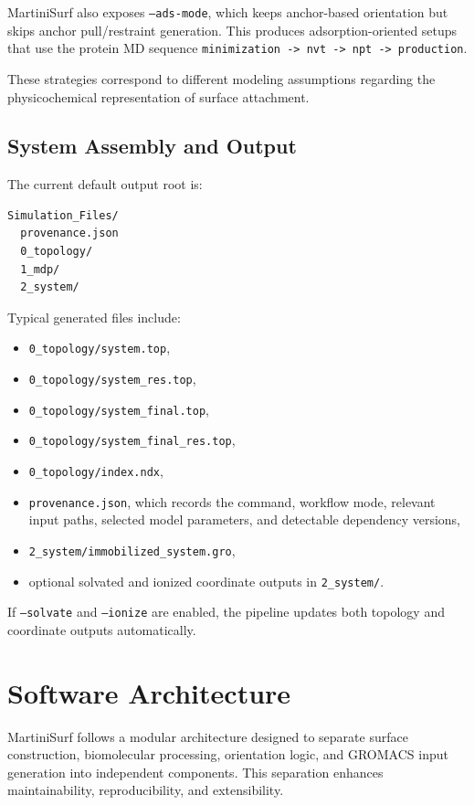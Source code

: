 \documentclass[11pt]{article}
\begin{document}
MartiniSurf also exposes \texttt{--ads-mode}, which keeps anchor-based
orientation but skips anchor pull/restraint generation. This produces
adsorption-oriented setups that use the protein MD sequence
\texttt{minimization -> nvt -> npt -> production}.

These strategies correspond to different modeling assumptions
regarding the physicochemical representation of surface attachment.
\subsection{System Assembly and Output}

The current default output root is:

\begin{lstlisting}
Simulation_Files/
  provenance.json
  0_topology/
  1_mdp/
  2_system/
\end{lstlisting}

Typical generated files include:
\begin{itemize}
  \item \texttt{0\_topology/system.top},
  \item \texttt{0\_topology/system\_res.top},
  \item \texttt{0\_topology/system\_final.top},
  \item \texttt{0\_topology/system\_final\_res.top},
  \item \texttt{0\_topology/index.ndx},
  \item \texttt{provenance.json}, which records the command, workflow mode,
  relevant input paths, selected model parameters, and detectable dependency
  versions,
  \item \texttt{2\_system/immobilized\_system.gro},
  \item optional solvated and ionized coordinate outputs in
  \texttt{2\_system/}.
\end{itemize}

If \texttt{--solvate} and \texttt{--ionize} are enabled, the pipeline
updates both topology and coordinate outputs automatically.

\section{Software Architecture}

MartiniSurf follows a modular architecture designed to separate
surface construction, biomolecular processing, orientation logic,
and GROMACS input generation into independent components.
This separation enhances maintainability, reproducibility,
and extensibility.
\end{document}
